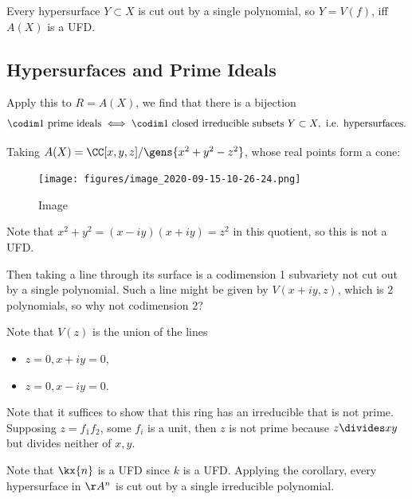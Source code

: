 \begin{corollary}[?]

Every hypersurface \(Y\subset X\) is cut out by a single polynomial, so
\(Y=V(f)\), iff \(A(X)\) is a UFD.

\end{corollary}

\hypertarget{hypersurfaces-and-prime-ideals}{%
\subsection{Hypersurfaces and Prime
Ideals}\label{hypersurfaces-and-prime-ideals}}

\begin{example}

Apply this to \(R=A(X)\), we find that there is a bijection
\begin{align*}  
\codim 1 \text{ prime ideals}
\iff 
\codim 1 \text{ closed irreducible subsets }Y\subset X,\text{ i.e. hypersurfaces}
.\end{align*}

Taking \(A(X) = \CC[x,y,z]/\gens{x^2+y^2-z^2}\), whose real points form
a cone:

\begin{figure}
\centering
\texttt{[image: figures/image\_2020-09-15-10-26-24.png]}
\caption{Image}
\end{figure}

Note that \(x^2 + y^2 = (x-iy)(x+iy) = z^2\) in this quotient, so this
is not a UFD.

Then taking a line through its surface is a codimension 1 subvariety not
cut out by a single polynomial. Such a line might be given by
\(V(x + iy, z)\), which is 2 polynomials, so why not codimension 2?

Note that \(V(z)\) is the union of the lines

\begin{itemize}
\tightlist
\item
  \(z = 0, x + iy= 0\),
\item
  \(z=0, x - iy = 0\).
\end{itemize}

Note that it suffices to show that this ring has an irreducible that is
not prime. Supposing \(z = f_1 f_2\), some \(f_i\) is a unit, then \(z\)
is not prime because \(z\divides xy\) but divides neither of \(x,y\).

\end{example}

\begin{example}

Note that \(\kx{n}\) is a UFD since \(k\) is a UFD. Applying the
corollary, every hypersurface in \(\AA^n\) is cut out by a single
irreducible polynomial.

\end{example}

